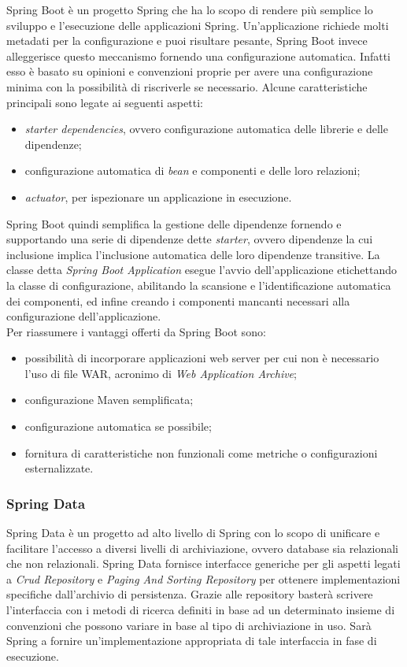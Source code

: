 Spring Boot è un progetto Spring che ha lo scopo di rendere più semplice lo sviluppo e l'esecuzione delle applicazioni Spring. Un'applicazione richiede molti metadati per la configurazione e puoi risultare pesante, Spring Boot invece alleggerisce questo meccanismo fornendo una configurazione automatica. Infatti esso è basato su opinioni e convenzioni proprie per avere una configurazione minima con la possibilità di riscriverle se necessario. Alcune caratteristiche principali sono legate ai seguenti aspetti:
\begin{itemize}
	\item \textit{starter dependencies}, ovvero configurazione automatica delle librerie e delle dipendenze;
	\item configurazione automatica di \textit{bean} e componenti e delle loro relazioni;
	\item \textit{actuator}, per ispezionare un applicazione in esecuzione.
\end{itemize} 
Spring Boot quindi semplifica la gestione delle dipendenze fornendo e supportando una serie di dipendenze dette \textit{starter}, ovvero dipendenze la cui inclusione implica l'inclusione automatica delle loro dipendenze transitive. La classe detta \textit{Spring Boot Application} esegue l'avvio dell'applicazione etichettando la classe di configurazione, abilitando la scansione e l'identificazione automatica dei componenti, ed infine creando i componenti mancanti necessari alla configurazione dell'applicazione.\\
Per riassumere i vantaggi offerti da Spring Boot sono:
\begin{itemize}
	\item possibilità di incorporare applicazioni web server per cui non è necessario l'uso di file WAR, acronimo di \textit{Web Application Archive};
	\item configurazione Maven semplificata;
	\item configurazione automatica se possibile;
	\item fornitura di caratteristiche non funzionali come metriche o configurazioni esternalizzate.
\end{itemize}

\subsubsection{Spring Data}
\label{subsubsec:spring-data}

Spring Data è un progetto ad alto livello di Spring con lo scopo di unificare e facilitare l'accesso a diversi livelli di archiviazione, ovvero database sia relazionali che non relazionali. Spring Data fornisce interfacce generiche per gli aspetti legati a \textit{Crud Repository} e \textit{Paging And Sorting Repository} per ottenere implementazioni specifiche dall'archivio di persistenza. Grazie alle repository basterà scrivere l'interfaccia con i metodi di ricerca definiti in base ad un determinato insieme di convenzioni che possono variare in base al tipo di archiviazione in uso. Sarà Spring  a fornire un'implementazione appropriata di tale interfaccia in fase di esecuzione.

